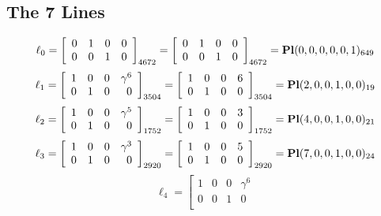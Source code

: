 \documentclass{article}
\begin{document}
{\subsection*{The 7 Lines}
$$
\ell_{0} = 
\left[
\begin{array}{*{4}{r}}
0 & 1 & 0 & 0\\
0 & 0 & 1 & 0\\
\end{array}
\right]
_{4672}
=
\left[
\begin{array}{*{4}c}
0  & 1  & 0  & 0\\
0  & 0  & 1  & 0\\
\end{array}
\right]_{4672}
={\rm\bf Pl}(0,0,0,0,0,1 )_{649}$$
$$
\ell_{1} = 
\left[
\begin{array}{*{4}{r}}
1 & 0 & 0 & \gamma^{6}\\
0 & 1 & 0 & 0\\
\end{array}
\right]
_{3504}
=
\left[
\begin{array}{*{4}c}
1  & 0  & 0  & 6\\
0  & 1  & 0  & 0\\
\end{array}
\right]_{3504}
={\rm\bf Pl}(2,0,0,1,0,0 )_{19}$$
$$
\ell_{2} = 
\left[
\begin{array}{*{4}{r}}
1 & 0 & 0 & \gamma^{5}\\
0 & 1 & 0 & 0\\
\end{array}
\right]
_{1752}
=
\left[
\begin{array}{*{4}c}
1  & 0  & 0  & 3\\
0  & 1  & 0  & 0\\
\end{array}
\right]_{1752}
={\rm\bf Pl}(4,0,0,1,0,0 )_{21}$$
$$
\ell_{3} = 
\left[
\begin{array}{*{4}{r}}
1 & 0 & 0 & \gamma^{3}\\
0 & 1 & 0 & 0\\
\end{array}
\right]
_{2920}
=
\left[
\begin{array}{*{4}c}
1  & 0  & 0  & 5\\
0  & 1  & 0  & 0\\
\end{array}
\right]_{2920}
={\rm\bf Pl}(7,0,0,1,0,0 )_{24}$$
$$
\ell_{4} = 
\left[
\begin{array}{*{4}{r}}
1 & 0 & 0 & \gamma^{6}\\
0 & 0 & 1 & 0\\

\end{array}$$}
\end{document}
